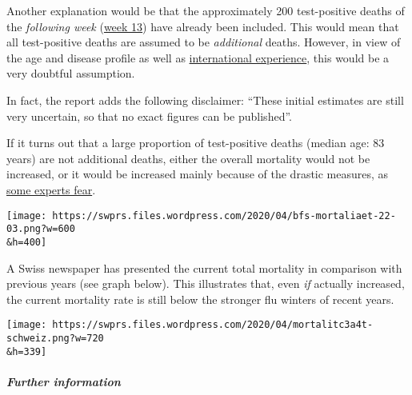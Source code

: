 Another explanation would be that the approximately 200 test-positive
deaths of the \emph{following week}
(\href{https://de.wikipedia.org/wiki/COVID-19-Pandemie_in_der_Schweiz\#Todesf\%C3\%A4lle}{week
13}) have already been included. This would mean that all test-positive
deaths are assumed to be \emph{additional} deaths. However, in view of
the age and disease profile as well as
\href{https://swprs.org/rki-relativiert-corona-todesfaelle/}{international
experience}, this would be a very doubtful assumption.

In fact, the report adds the following disclaimer: ``These initial
estimates are still very uncertain, so that no exact figures can be
published''.

If it turns out that a large proportion of test-positive deaths (median
age: 83 years) are not additional deaths, either the overall mortality
would not be increased, or it would be increased mainly because of the
drastic measures, as
\href{https://swprs.org/open-letter-from-professor-sucharit-bhakdi-to-german-chancellor-dr-angela-merkel/}{some
experts fear}.

\texttt{[image: https://swprs.files.wordpress.com/2020/04/bfs-mortaliaet-22-03.png?w=600\\\&h=400]}

A Swiss newspaper has presented the current total mortality in
comparison with previous years (see graph below). This illustrates that,
even \emph{if} actually increased, the current mortality rate is still
below the stronger flu winters of recent years.

\texttt{[image: https://swprs.files.wordpress.com/2020/04/mortalitc3a4t-schweiz.png?w=720\\\&h=339]}

\hypertarget{further-information}{%
\subparagraph{\texorpdfstring{\textbf{Further
information}}{Further information}}\label{further-information}}

